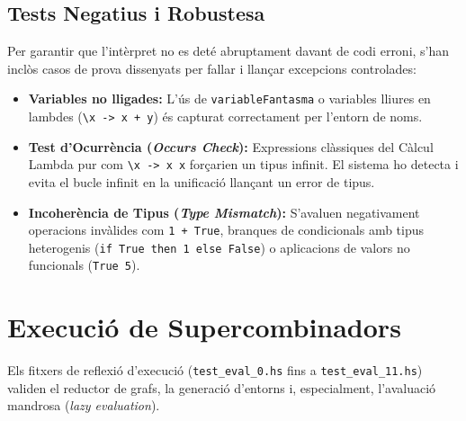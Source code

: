 \subsection{Tests Negatius i Robustesa}
Per garantir que l'intèrpret no es deté abruptament davant de codi erroni, s'han inclòs casos de prova dissenyats per fallar i llançar excepcions controlades:
\begin{itemize}
    \item \textbf{Variables no lligades:} L'ús de \texttt{variableFantasma} o variables lliures en lambdes (\texttt{\textbackslash x -> x + y}) és capturat correctament per l'entorn de noms.
    \item \textbf{Test d'Ocurrència (\emph{Occurs Check}):} Expressions clàssiques del Càlcul Lambda pur com \texttt{\textbackslash x -> x x} forçarien un tipus infinit. El sistema ho detecta i evita el bucle infinit en la unificació llançant un error de tipus.
    \item \textbf{Incoherència de Tipus (\emph{Type Mismatch}):} S'avaluen negativament operacions invàlides com \texttt{1 + True}, branques de condicionals amb tipus heterogenis (\texttt{if True then 1 else False}) o aplicacions de valors no funcionals (\texttt{True 5}).
\end{itemize}

\section{Execució de Supercombinadors}

Els fitxers de reflexió d'execució (\texttt{test\_eval\_0.hs} fins a \texttt{test\_eval\_11.hs}) validen el reductor de grafs, la generació d'entorns i, especialment, l'avaluació mandrosa (\emph{lazy evaluation}).

